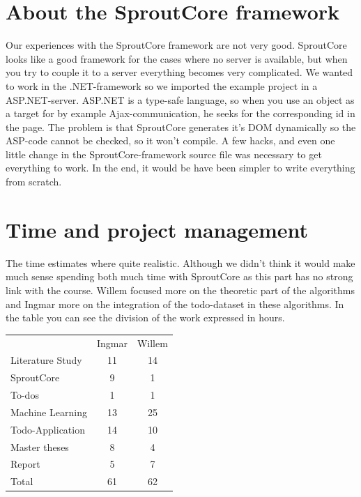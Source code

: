 \documentclass[a4paper,titlepage]{article}
\begin{document}
\section{About the SproutCore framework}
Our experiences with the SproutCore framework are not very good. SproutCore looks like a good framework for the cases where no server is available, but when you try to couple it to a server everything becomes very complicated. We wanted to work in the .NET-framework so we imported the example project in a ASP.NET-server. ASP.NET is a type-safe language, so when you use an object as a target for by example Ajax-communication, he seeks for the corresponding id in the page. 
The problem is that SproutCore generates it's DOM dynamically so the ASP-code cannot be checked, so it won't compile. A few hacks, and even one little change in the SproutCore-framework source file was necessary to get everything to work. In the end, it would be have been simpler to write everything from scratch. 

\section{Time and project management}
The time estimates where quite realistic. Although we didn't think it would make much sense spending both much time with SproutCore as this part has no strong link with the course. Willem focused more on the theoretic part of the algorithms and Ingmar more on the integration of the todo-dataset in these algorithms. In the table you can see the division of the work expressed in hours.
\begin{table}[H]
\centering
\begin{tabular}{lcc}
&Ingmar&Willem \\
Literature Study & 11 & 14\\
SproutCore & 9 & 1\\
To-dos & 1 & 1\\
Machine Learning & 13 & 25\\
Todo-Application & 14 & 10 \\
Master theses & 8 & 4\\
Report & 5 & 7\\
\hline
Total & 61 & 62
\end{tabular}
\end{table}
\end{document}
